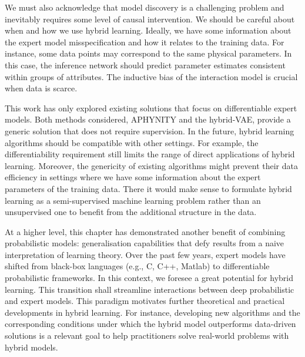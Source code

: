 We must also acknowledge that model discovery is a challenging problem and inevitably requires some level of causal intervention. We should be careful about when and how we use hybrid learning. Ideally, we have some information about the expert model misspecification and how it relates to the training data. For instance, some data points may correspond to the same physical parameters. In this case, the inference network should predict parameter estimates consistent within groups of attributes. The inductive bias of the interaction model is crucial when data is scarce.

This work has only explored existing solutions that focus on differentiable expert models. Both methods considered, APHYNITY and the hybrid-VAE, provide a generic solution that does not require supervision. In the future, hybrid learning algorithms should be compatible with other settings. For example, the differentiability requirement still limits the range of direct applications of hybrid learning. Moreover, the genericity of existing algorithms might prevent their data efficiency in settings where we have some information about the expert parameters of the training data. There it would make sense to formulate hybrid learning as a semi-supervised machine learning problem rather than an unsupervised one to benefit from the additional structure in the data.

At a higher level, this chapter has demonstrated another benefit of combining probabilistic models: generalisation capabilities that defy results from a naive interpretation of learning theory. Over the past few years, expert models have shifted from black-box languages (e.g., C, C++, Matlab) to differentiable probabilistic frameworks. In this context, we foresee a great potential for hybrid learning. This transition shall streamline interactions between deep probabilistic and expert models. This paradigm motivates further theoretical and practical developments in hybrid learning. For instance, developing new algorithms and the corresponding conditions under which the hybrid model outperforms data-driven solutions is a relevant goal to help practitioners solve real-world problems with hybrid models.
